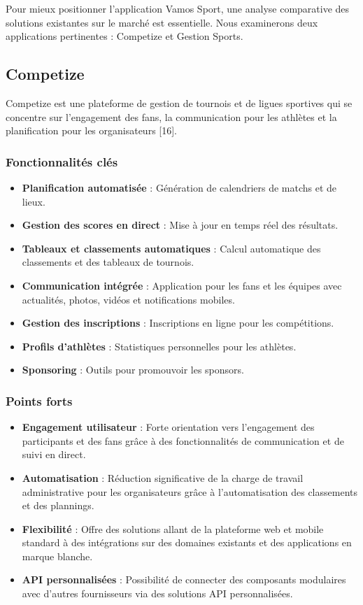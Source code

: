 \documentclass{article}
\begin{document}
Pour mieux positionner l'application Vamos Sport, une analyse comparative des solutions existantes sur le marché est essentielle. Nous examinerons deux applications pertinentes : Competize et Gestion Sports.

\subsection{Competize}

Competize est une plateforme de gestion de tournois et de ligues sportives qui se concentre sur l'engagement des fans, la communication pour les athlètes et la planification pour les organisateurs [16].

\subsubsection{Fonctionnalités clés}
\begin{itemize}
    \item \textbf{Planification automatisée} : Génération de calendriers de matchs et de lieux.
    \item \textbf{Gestion des scores en direct} : Mise à jour en temps réel des résultats.
    \item \textbf{Tableaux et classements automatiques} : Calcul automatique des classements et des tableaux de tournois.
    \item \textbf{Communication intégrée} : Application pour les fans et les équipes avec actualités, photos, vidéos et notifications mobiles.
    \item \textbf{Gestion des inscriptions} : Inscriptions en ligne pour les compétitions.
    \item \textbf{Profils d'athlètes} : Statistiques personnelles pour les athlètes.
    \item \textbf{Sponsoring} : Outils pour promouvoir les sponsors.
\end{itemize}

\subsubsection{Points forts}
\begin{itemize}
    \item \textbf{Engagement utilisateur} : Forte orientation vers l'engagement des participants et des fans grâce à des fonctionnalités de communication et de suivi en direct.
    \item \textbf{Automatisation} : Réduction significative de la charge de travail administrative pour les organisateurs grâce à l'automatisation des classements et des plannings.
    \item \textbf{Flexibilité} : Offre des solutions allant de la plateforme web et mobile standard à des intégrations sur des domaines existants et des applications en marque blanche.
    \item \textbf{API personnalisées} : Possibilité de connecter des composants modulaires avec d'autres fournisseurs via des solutions API personnalisées.
\end{itemize}
\end{document}
